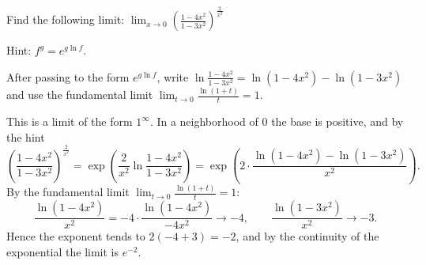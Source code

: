 
\begin{question}
Find the following limit:
$\displaystyle\lim_{x\to0}\left(\frac{1-4x^2}{1-3x^2}\right)^{\frac{2}{x^2}}$

Hint: $f^g=e^{g\ln f}$.
\end{question}

\begin{hint}
After passing to the form $e^{g\ln f}$, write $\ln\frac{1-4x^2}{1-3x^2}=\ln(1-4x^2)-\ln(1-3x^2)$ and use the fundamental limit $\lim_{t\to0}\frac{\ln(1+t)}{t}=1$.
\end{hint}

\begin{solution}
This is a limit of the form $1^\infty$. In a neighborhood of $0$ the base is positive, and by the hint
\[ \left(\frac{1-4x^2}{1-3x^2}\right)^{\frac2{x^2}}=\exp\!\left(\frac{2}{x^2}\ln\frac{1-4x^2}{1-3x^2}\right)=\exp\!\left(2\cdot\frac{\ln(1-4x^2)-\ln(1-3x^2)}{x^2}\right). \]
By the fundamental limit $\lim_{t\to0}\frac{\ln(1+t)}{t}=1$:
\[ \frac{\ln(1-4x^2)}{x^2}=-4\cdot\frac{\ln(1-4x^2)}{-4x^2}\to-4,\qquad \frac{\ln(1-3x^2)}{x^2}\to-3. \]
Hence the exponent tends to $2(-4+3)=-2$, and by the continuity of the exponential the limit is $e^{-2}$.
\end{solution}
